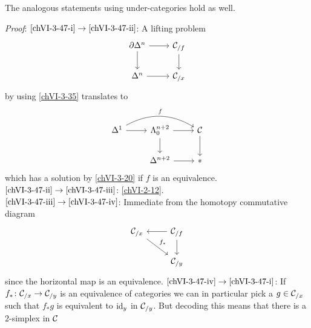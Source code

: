         The analogous statements using under-categories hold as well.
        \smallskip

        \emph{Proof}: $\ref{chVI-3-47-i} \to \ref{chVI-3-47-ii}$: A lifting problem
        \begin{equation*}
            \begin{tikzcd}
                \partial \Delta^n \arrow[d] \arrow[r] & \Cc_{/ f} \arrow[d] \\
                \Delta^n \arrow[r] & \Cc_{/ x}
            \end{tikzcd}	
        \end{equation*}
        by using \ref{chVI-3-35} translates to
        \begin{equation*}
            \begin{tikzcd}
                \Delta^1 \arrow[r] \arrow[rr, "f", bend left] & \horn{n+2}{0} \arrow[d] \arrow[r] & \Cc \arrow[d] \\
                & \Delta^{n+2} \arrow[r] & * 
            \end{tikzcd}	
        \end{equation*}
        which has a solution by \ref{chVI-3-20} if $f$ is an equivalence. \\
        $\ref{chVI-3-47-ii} \to \ref{chVI-3-47-iii}$: \ref{chVI-2-12}. \\
        $\ref{chVI-3-47-iii} \to \ref{chVI-3-47-iv}$: Immediate from the homotopy commutative diagram
        \begin{equation*}
            \begin{tikzcd}
                \Cc_{/ x} \arrow[rd, "f_*"] & \Cc_{/ f} \arrow[l] \arrow[d] \\
                & \Cc_{/ y}
            \end{tikzcd}	
        \end{equation*}	
        since the horizontal map is an equivalence.
        $\ref{chVI-3-47-iv} \to \ref{chVI-3-47-i}$: If $f_* \colon \mathcal{C}_{/ x} \to \mathcal{C}_{/ y}$ is an equivalence of categories we can in particular pick a $g \in \mathcal{C}_{/ x}$ such that $f_* g$ is equivalent to $\operatorname{id}_y$ in $\mathcal{C}_{/ y}$. But decoding this means that there is a $2$-simplex in $\mathcal{C}$
